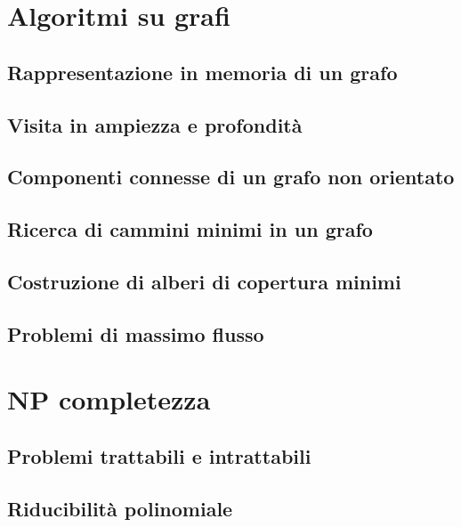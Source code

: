 \documentclass[12pt, a4paper, openany]{book}
\begin{document}
\chapter{Algoritmi su grafi}

\section{Rappresentazione in memoria di un grafo}
\section{Visita in ampiezza e profondità}
\section{Componenti connesse di un grafo non orientato}
\section{Ricerca di cammini minimi in un grafo}
\section{Costruzione di alberi di copertura minimi}
\section{Problemi di massimo flusso}

\chapter{NP completezza}

\section{Problemi trattabili e intrattabili}
\section{Riducibilità polinomiale}
\end{document}
